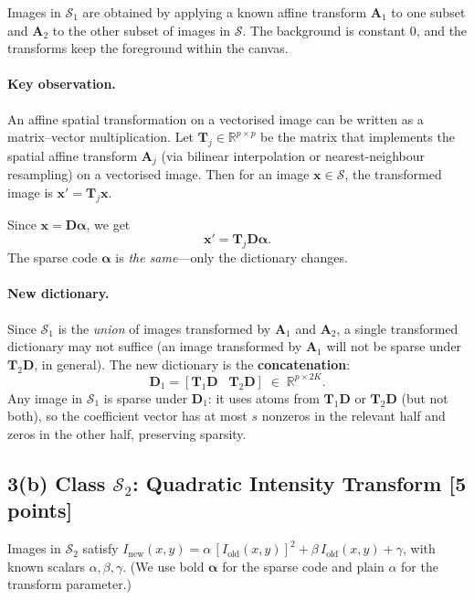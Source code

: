 \documentclass[11pt]{article}
\begin{document}
Images in $\mathcal{S}_1$ are obtained by applying a known affine transform $\boldsymbol{A}_1$
to one subset and $\boldsymbol{A}_2$ to the other subset of images in $\mathcal{S}$.
The background is constant 0, and the transforms keep the foreground within the canvas.

\paragraph{Key observation.}
An affine spatial transformation on a vectorised image can be written as a
matrix--vector multiplication.
Let $\boldsymbol{T}_j \in \mathbb{R}^{p \times p}$ be the matrix that implements the
spatial affine transform $\boldsymbol{A}_j$ (via bilinear interpolation or
nearest-neighbour resampling) on a vectorised image.
Then for an image $\boldsymbol{x} \in \mathcal{S}$, the transformed image is
$\boldsymbol{x}' = \boldsymbol{T}_j\boldsymbol{x}$.

Since $\boldsymbol{x} = \boldsymbol{D}\boldsymbol{\alpha}$, we get
\[
\boldsymbol{x}' = \boldsymbol{T}_j\boldsymbol{D}\boldsymbol{\alpha}.
\]
The sparse code $\boldsymbol{\alpha}$ is \emph{the same}---only the dictionary changes.

\paragraph{New dictionary.}
Since $\mathcal{S}_1$ is the \emph{union} of images transformed by $\boldsymbol{A}_1$ and
$\boldsymbol{A}_2$, a single transformed dictionary may not suffice (an image transformed
by $\boldsymbol{A}_1$ will not be sparse under $\boldsymbol{T}_2\boldsymbol{D}$, in general).
The new dictionary is the \textbf{concatenation}:
\[
\boxed{\boldsymbol{D}_1 = [\boldsymbol{T}_1\boldsymbol{D} \;\;\; \boldsymbol{T}_2\boldsymbol{D}]
\;\in\;\mathbb{R}^{p \times 2K}.}
\]
Any image in $\mathcal{S}_1$ is sparse under $\boldsymbol{D}_1$: it uses atoms from
$\boldsymbol{T}_1\boldsymbol{D}$ or $\boldsymbol{T}_2\boldsymbol{D}$ (but not both),
so the coefficient vector has at most $s$ nonzeros in the relevant half and zeros in the
other half, preserving sparsity.

\subsection*{3(b) Class $\mathcal{S}_2$: Quadratic Intensity Transform [5 points]}

Images in $\mathcal{S}_2$ satisfy
$I_{\text{new}}(x,y) = \alpha\,[I_{\text{old}}(x,y)]^2 + \beta\,I_{\text{old}}(x,y) + \gamma$,
with known scalars $\alpha,\beta,\gamma$.
(We use bold $\boldsymbol{\alpha}$ for the sparse code and plain $\alpha$ for the transform parameter.)
\end{document}
